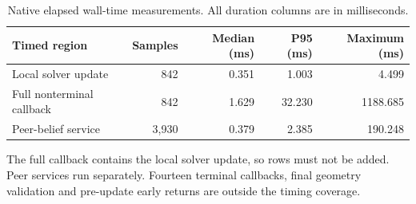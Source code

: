 \begin{table}[htbp]
\centering\small
\caption{Native elapsed wall-time measurements. All duration columns are in milliseconds.}
\label{tab:timing}
\begin{tabular}{lrrrr}
\toprule
Timed region & Samples & Median (ms) & P95 (ms) & Maximum (ms) \\
\midrule
Local solver update & 842 & 0.351 & 1.003 & 4.499 \\
Full nonterminal callback & 842 & 1.629 & 32.230 & 1188.685 \\
Peer-belief service & 3,930 & 0.379 & 2.385 & 190.248 \\
\bottomrule
\end{tabular}
\par\vspace{5pt}\begin{minipage}{0.97\linewidth}\footnotesize The full callback contains the local solver update, so rows must not be added. Peer services run separately. Fourteen terminal callbacks, final geometry validation and pre-update early returns are outside the timing coverage.\end{minipage}
\end{table}
